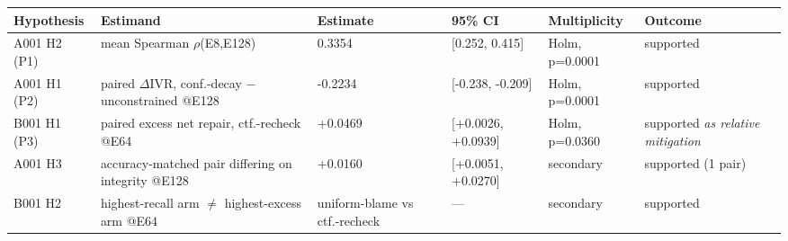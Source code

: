 \begin{tabular}{llllll}
\toprule
Hypothesis & Estimand & Estimate & 95\% CI & Multiplicity & Outcome \\
\midrule
A001 H2 (P1) & mean Spearman $\rho$(E8,E128) & 0.3354 & [0.252, 0.415] & Holm, p=0.0001 & supported \\
A001 H1 (P2) & paired $\Delta$IVR, conf.-decay $-$ unconstrained @E128 & -0.2234 & [-0.238, -0.209] & Holm, p=0.0001 & supported \\
B001 H1 (P3) & paired excess net repair, ctf.-recheck @E64 & +0.0469 & [+0.0026, +0.0939] & Holm, p=0.0360 & supported \emph{as relative mitigation} \\
A001 H3 & accuracy-matched pair differing on integrity @E128 & +0.0160 & [+0.0051, +0.0270] & secondary & supported (1 pair) \\
B001 H2 & highest-recall arm $\neq$ highest-excess arm @E64 & uniform-blame vs ctf.-recheck & --- & secondary & supported \\
\bottomrule
\end{tabular}